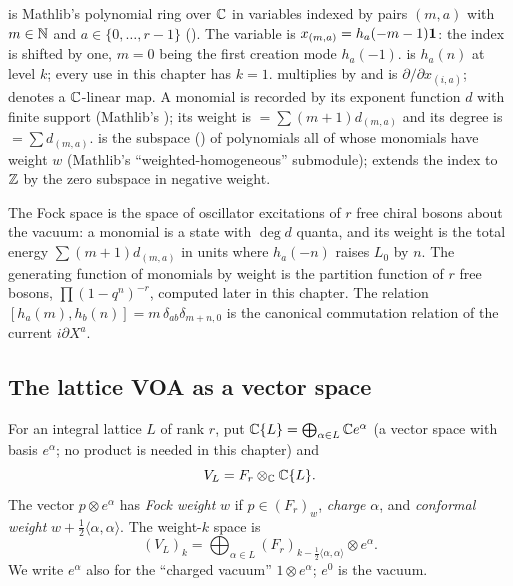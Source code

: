 \begin{dictionary}
 is Mathlib's polynomial ring over ${\mathbb{C}}$ in variables indexed by
pairs $(m,a)$ with $m\in{\mathbb{N}}$ and $a\in\{0,\dots,r-1\}$ (). The variable
 is $x_{(m,a)}=h_a(-m-1)\mathbf{1}$: the index is shifted by one, $m=0$ being the
first creation mode $h_a(-1)$.  is $h_a(n)$ at level $k$; every use in this
chapter has $k=1$.  multiplies by  and  is
$\partial/\partial x_{(i,a)}$;  denotes a ${\mathbb{C}}$-linear map. A monomial is recorded by its
exponent function $d$ with finite support (Mathlib's ); its weight is
 $=\sum(m+1)d_{(m,a)}$ and its degree is 
$=\sum d_{(m,a)}$.  is the subspace () of polynomials all of whose
monomials have weight $w$ (Mathlib's ``weighted-homogeneous'' submodule);  extends
the index to ${\mathbb{Z}}$ by the zero subspace  in negative weight.
\end{dictionary}

\begin{physics}
The Fock space is the space of oscillator excitations of $r$ free chiral bosons about the vacuum: a monomial is a state with $\deg d$ quanta, and its weight is the total energy $\sum(m+1)d_{(m,a)}$ in units where $h_a(-n)$ raises $L_0$ by $n$. The generating function of monomials by weight is the partition function of $r$ free bosons, $\prod(1-q^n)^{-r}$, computed later in this chapter. The relation $[h_a(m),h_b(n)]=m\,\delta_{ab}\delta_{m+n,0}$ is the canonical commutation relation of the current $i\partial X^a$.
\end{physics}

\subsection{The lattice VOA as a vector space}

\begin{definition}\label{ch04:def:VL}
For an integral lattice $L$ of rank $r$, put ${\mathbb{C}}\{L\}=\bigoplus_{\alpha\in L}{\mathbb{C}} e^\alpha$ (a vector
space with basis $e^\alpha$; no product is needed in this chapter) and
\begin{equation*}
  V_L = F_r\otimes_{{\mathbb{C}}} {\mathbb{C}}\{L\}.
\end{equation*}
The vector $p\otimes e^\alpha$ has \emph{Fock weight} $w$ if $p\in(F_r)_w$, \emph{charge} $\alpha$,
and \emph{conformal weight} $w+\tfrac12\langle\alpha,\alpha\rangle$. The weight-$k$ space is
\begin{equation*}
  (V_L)_k=\bigoplus_{\alpha\in L}(F_r)_{k-\frac12\langle\alpha,\alpha\rangle}\otimes e^\alpha .
\end{equation*}
We write $e^\alpha$ also for the ``charged vacuum'' $1\otimes e^\alpha$; $e^0$ is the vacuum.
\end{definition}

